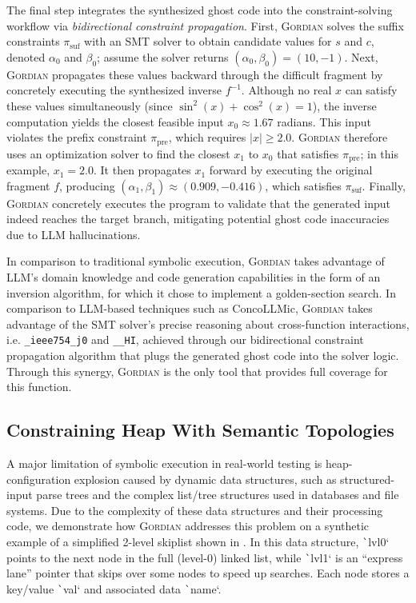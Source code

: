 \documentclass[acmsmall,screen,nonacm]{acmart}
\newcommand{\projName}{\textsc{Gordian}\xspace}
\theoremstyle{definition}
\begin{document}
The final step integrates the synthesized ghost code into the constraint-solving workflow via \emph{bidirectional constraint propagation}. First, \projName solves the suffix constraints \(\pi_{\mathrm{suf}}\) with an SMT solver to obtain candidate values for \(s\) and \(c\), denoted \(\alpha_0\) and \(\beta_0\); assume the solver returns \((\alpha_0,\beta_0)=(10,-1)\). Next, \projName propagates these values backward through the difficult fragment by concretely executing the synthesized inverse \(f^{-1}\). Although no real \(x\) can satisfy these values simultaneously (since \(\sin^2(x)+\cos^2(x)=1\)), the inverse computation yields the closest feasible input \(x_0 \approx 1.67\) radians. This input violates the prefix constraint \(\pi_{\mathrm{pre}}\), which requires \(|x|\ge 2.0\). \projName therefore uses an optimization solver to find the closest \(x_1\) to \(x_0\) that satisfies \(\pi_{\mathrm{pre}}\); in this example, \(x_1=2.0\). It then propagates \(x_1\) forward by executing the original fragment \(f\), producing \((\alpha_1,\beta_1)\approx(0.909,-0.416)\), which satisfies \(\pi_{\mathrm{suf}}\). Finally, \projName concretely executes the program to validate that the generated input indeed reaches the target branch, mitigating potential ghost code inaccuracies due to LLM hallucinations.

In comparison to traditional symbolic execution, \projName takes advantage of LLM's domain knowledge and code generation capabilities in the form of an inversion algorithm, for which it chose to implement a golden-section search. In comparison to LLM-based techniques such as ConcoLLMic, \projName takes advantage of the SMT solver's precise reasoning about cross-function interactions, i.e. \texttt{_ieee754_j0} and \texttt{__HI}, achieved through our bidirectional constraint propagation algorithm that plugs the generated ghost code into the solver logic. Through this synergy, \projName is the only tool that provides full coverage for this function.

\subsection{Constraining Heap With Semantic Topologies}

A major limitation of symbolic execution in real-world testing is heap-configuration explosion caused by dynamic data structures, such as structured-input parse trees and the complex list/tree structures used in databases and file systems. Due to the complexity of these data structures and their processing code, we demonstrate how \projName addresses this problem on a synthetic example of a simplified 2-level skiplist shown in . In this data structure, \texttt`lvl0` points to the next node in the full (level-0) linked list, while \texttt`lvl1` is an ``express lane'' pointer that skips over some nodes to speed up searches. Each node stores a key/value \texttt`val` and associated data \texttt`name`.
\end{document}
